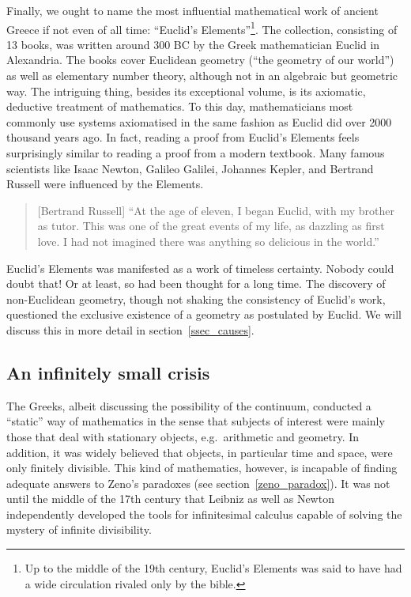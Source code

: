 \documentclass[hidelinks]{article}
\begin{document}
Finally, we ought to name the most influential mathematical work of ancient Greece if not even of all time: ``Euclid's Elements''\footnote{Up to the middle of the 19th century, Euclid's Elements was said to have had a wide circulation rivaled only by the bible.}. 
The collection, consisting of 13 books, was written around 300 BC by the Greek mathematician Euclid in Alexandria. The books cover Euclidean geometry (``the geometry of our world'') as well as elementary number theory, although not in an algebraic but geometric way. The intriguing thing, besides its exceptional volume, is its axiomatic, deductive treatment of mathematics. To this day, mathematicians most commonly use systems axiomatised in the same fashion as Euclid did over 2000 thousand years ago. In fact, reading a proof from Euclid's Elements feels surprisingly similar to reading a proof from a modern textbook. Many famous scientists like Isaac Newton, Galileo Galilei, Johannes Kepler, and Bertrand Russell were influenced by the Elements.
\begin{quote}[Bertrand Russell]
	``At the age of eleven, I began Euclid, with my brother as tutor. This was one of the great events of my life, as dazzling as first love. I had not imagined there was anything so delicious in the world.''\cite{russell_autobiography}
\end{quote}
Euclid's Elements was manifested as a work of timeless certainty. Nobody could doubt that! Or at least, so had been thought for a long time. The discovery of non-Euclidean geometry, though not shaking the consistency of Euclid's work, questioned the exclusive existence of a geometry as postulated by Euclid. We will discuss this in more detail in section~\ref{ssec_causes}.

\subsection{An infinitely small crisis}
The Greeks, albeit discussing the possibility of the continuum, conducted a ``static'' way of mathematics in the sense that subjects of interest were mainly those that deal with stationary objects, e.g.\ arithmetic and geometry. In addition, it was widely believed that objects, in particular time and space, were only finitely divisible. This kind of mathematics, however, is incapable of finding adequate answers to Zeno's paradoxes (see section~\ref{zeno_paradox}).
It was not until the middle of the 17th century that Leibniz as well as Newton independently developed the tools for infinitesimal calculus capable of solving the mystery of infinite divisibility.
\end{document}
